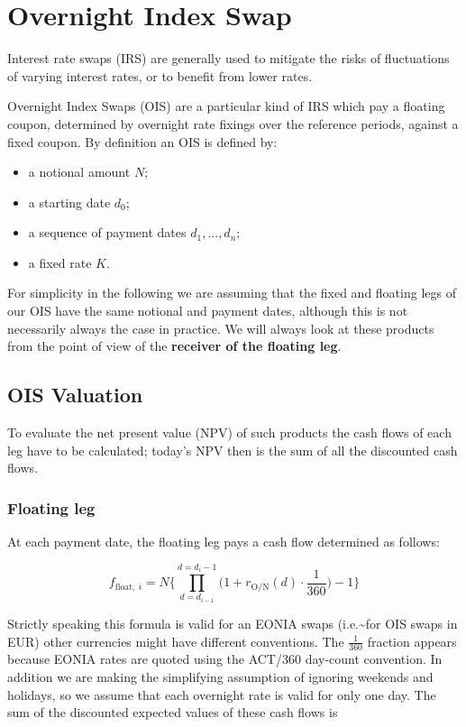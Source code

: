 \section{Overnight Index Swap}\label{overnight-index-swap}

Interest rate swaps (IRS) are generally used to mitigate the risks of
fluctuations of varying interest rates, or to benefit from lower rates.

Overnight Index Swaps (OIS) are a particular kind of IRS which pay a
floating coupon, determined by overnight rate fixings over the reference
periods, against a fixed coupon. By definition an OIS is defined by:

\begin{itemize}
\tightlist
\item
  a notional amount \(N\);
\item
  a starting date \(d_0\);
\item
  a sequence of payment dates \(d_1,...,d_n\);
\item
  a fixed rate \(K\).
\end{itemize}

For simplicity in the following we are assuming that the fixed and
floating legs of our OIS have the same notional and payment dates,
although this is not necessarily always the case in practice.
We will always look at these products from the point of view of the
\textbf{receiver of the floating leg}.

\subsection{OIS Valuation}\label{ois-valuation}
To evaluate the net present value (NPV) of such products the cash flows
of each leg have to be calculated; today's NPV then is the sum of all
the discounted cash flows.

\subsubsection{Floating leg}\label{floating-leg}

At each payment date, the floating leg pays a cash flow determined as
follows:

\[f_{\mathrm{float},~i} = N \Bigg\{\prod_{d=d_{i-1}}^{d=d_i-1}\Big(1+r_{\mathrm{O/N}}(d)\cdot\frac{1}{360}\Big) -1 \Bigg\}\]

Strictly speaking this formula is valid for an EONIA swaps
(i.e.\textasciitilde{}for OIS swaps in EUR) other currencies might have
different conventions. The \(\frac{1}{360}\) fraction appears because
EONIA rates are quoted using the ACT/360 day-count convention. In
addition we are making the simplifying assumption of ignoring weekends
and holidays, so we assume that each overnight rate is valid for only
one day. The sum of the discounted expected values of these cash flows
is

